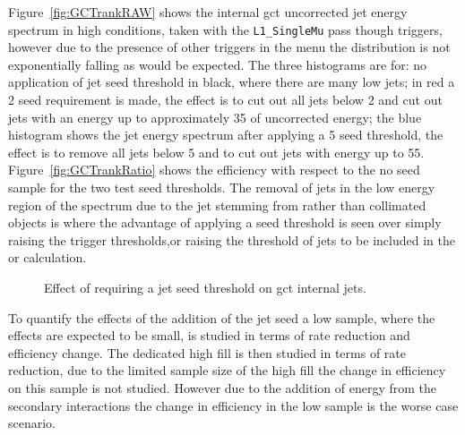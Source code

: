 Figure~\ref{fig:GCTrankRAW} shows the internal \ac{gct} uncorrected jet energy 
spectrum in high \pu conditions, taken with the \verb|L1_SingleMu| pass 
though triggers, however due to the presence of other triggers in the menu the distribution is not exponentially falling as would be expected. The three histograms are for: no application of jet seed threshold in black, where there are many low \ET jets; in red a \unit{2}{\GeV} seed requirement is made, the effect is to cut out all jets below \unit{2}{\GeV} and cut out jets with an energy up to approximately \unit{35}{\GeV} of uncorrected energy; the blue histogram shows the jet energy spectrum after applying a \unit{5}{\GeV} seed threshold, the effect is to remove all jets below \unit{5}{\GeV} and to cut out jets with energy up to \unit{55}{\GeV}. Figure~\ref{fig:GCTrankRatio} shows the efficiency with respect to the no seed sample for the two test seed thresholds. The removal of jets in the low energy region of the \ET spectrum due to the jet stemming from \pu rather than collimated objects is where the advantage of applying a seed threshold is seen over simply raising the trigger thresholds,or raising the threshold of jets to be included in the \Lone \HT or \HTm calculation.


\begin{figure}[h!]
    \centering
    \caption{Effect of requiring a jet seed threshold on \ac{gct} internal jets.}
    \label{fig:GCTrank}
\end{figure}



To quantify the effects of the addition of the jet seed a low \pu sample, 
where the effects are expected to be small, is studied in terms of rate 
reduction and efficiency change. The dedicated high \pu fill is then 
studied in terms of rate reduction, due to the limited sample size of the high 
\pu fill the change in efficiency on this sample is not studied. However 
due to the addition of energy from the secondary \pu interactions the 
change in efficiency in the low \pu sample is the worse case scenario.

